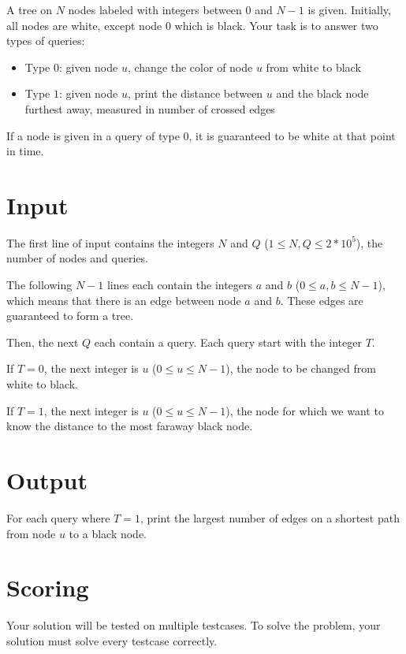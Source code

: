A tree on $N$ nodes labeled with integers between $0$ and $N-1$ is given. Initially, all nodes are white,
except node $0$ which is black. Your task is to answer two types of queries:

\begin{itemize}
    \item Type $0$: given node $u$, change the color of node $u$ from white to black
    \item Type $1$: given node $u$, print the distance between $u$ and the black node furthest away, measured in number of crossed edges
\end{itemize}

If a node is given in a query of type $0$, it is guaranteed to be white at that point in time.


\section*{Input}
The first line of input contains the integers $N$ and $Q$ ($1 \leq N,Q \leq 2*10^5$), the number of nodes and queries.

The following $N-1$ lines each contain the integers $a$ and $b$ ($0 \leq a,b \leq N-1$), which means that
there is an edge between node $a$ and $b$. These edges are guaranteed to form a tree.

Then, the next $Q$ each contain a query. Each query start with the integer $T$.

If $T=0$, the next integer is $u$ ($0 \leq u \leq N-1$), the node to be changed from white to black.

If $T=1$, the next integer is $u$ ($0 \leq u \leq N-1$), the node for which we want to know the distance to the most faraway black node.

\section*{Output}
For each query where $T=1$, print the largest number of edges on a shortest path from node $u$ to a black node.

\section*{Scoring}
Your solution will be tested on multiple testcases.
\noindent
To solve the problem, your solution must solve every testcase correctly.
